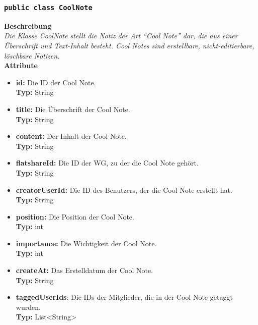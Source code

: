 \subsubsection{\texttt{public class CoolNote}}

	\textbf{Beschreibung} \\
	\textit{Die Klasse CoolNote stellt die Notiz der Art “Cool Note” dar, die aus einer Überschrift und Text-Inhalt besteht. Cool Notes sind erstellbare, nicht-editierbare, löschbare Notizen.} \\
	
	\textbf{Attribute}
	\begin{itemize}
		\item \textbf{id:} Die ID der Cool Note. \\
		\textbf{Typ:} String
		\item \textbf{title:} Die Überschrift der Cool Note. \\
		\textbf{Typ:} String
		\item \textbf{content:} Der Inhalt der Cool Note. \\
		\textbf{Typ:} String
		\item \textbf{flatshareId:} Die ID der WG, zu der die Cool Note gehört. \\
		\textbf{Typ:} String
		\item \textbf{creatorUserId:} Die ID des Benutzers, der die Cool Note erstellt hat. \\
		\textbf{Typ:} String
		\item \textbf{position:} Die Position der Cool Note. \\
		\textbf{Typ:} int
		\item \textbf{importance:} Die Wichtigkeit der Cool Note. \\
		\textbf{Typ:} int
		\item \textbf{createAt:} Das Erstelldatum der Cool Note.\\
		\textbf{Typ:} String
		\item \textbf{taggedUserIds}: Die IDs der Mitglieder, die in der Cool Note getaggt wurden.\\
		\textbf{Typ:} List<String>
	\end{itemize}

